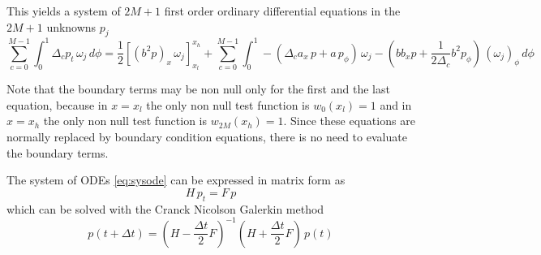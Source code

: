\documentclass[10pt]{article}
\newcommand {\dv}[1]{\Delta_{#1}}
\newcommand {\dvc}[0]{\dv{c}}
\begin{document}
\noindent This yields a system of $2M+1$ first order ordinary differential equations in the $2M+1$ unknowns $p_j$
\begin{equation}
\label{eq:sysode}
\sum_{c=0}^{M-1}\int_0^1 \dvc p_t\, \omega_j\, d\phi =
\frac{1}{2} [ (b^2p)_x \, \omega_j ]_{x_l}^{x_h}
+\sum_{c=0}^{M-1}\int_0^1 -(\dvc a_x\, p+a\,p_\phi)\,\omega_j -\left(bb_xp+\frac{1}{2\dvc} b^2p_\phi\right) \,(\omega_j)_{\phi}\,d\phi
\end{equation}

\noindent Note that the boundary terms may be non null only for the first and the last equation, because in $x=x_l$ the only non null test function is $w_0(x_l)=1$ and in $x=x_h$ the only non null test function is $w_{2M}(x_h)=1$. Since these equations are normally replaced by boundary condition equations, there is no need to evaluate the boundary terms. 

\noindent The system of ODEs \eqref{eq:sysode} can be expressed in matrix form as
\begin{equation}
   H\,p_t = F \, p
\end{equation}
which can be solved with the Cranck Nicolson Galerkin method
\begin{equation}
\label{eq:sysodemat}
   p(t+\Delta t) = \left( H-\frac{\Delta t}{2}F \right)^{-1}\left( H+\frac{\Delta t}{2}F\right) \, p(t)
\end{equation}
\end{document}
